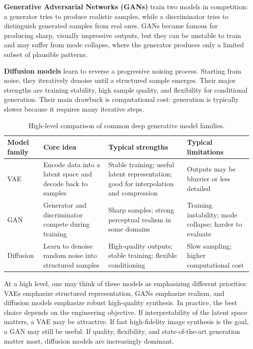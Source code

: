\documentclass[12pt]{article}
\begin{document}
\textbf{Generative Adversarial Networks (GANs)} train two models in competition: a generator tries to produce realistic samples, while a discriminator tries to distinguish generated samples from real ones. GANs became famous for producing sharp, visually impressive outputs, but they can be unstable to train and may suffer from mode collapse, where the generator produces only a limited subset of plausible patterns.

\textbf{Diffusion models} learn to reverse a progressive noising process. Starting from noise, they iteratively denoise until a structured sample emerges. Their major strengths are training stability, high sample quality, and flexibility for conditional generation. Their main drawback is computational cost: generation is typically slower because it requires many iterative steps.

\begin{table}[ht]
\centering
\caption{High-level comparison of common deep generative model families.}
\begin{tabular}{p{} p{} p{} p{}}
\toprule
\textbf{Model family} & \textbf{Core idea} & \textbf{Typical strengths} & \textbf{Typical limitations} \\
\midrule
VAE & Encode data into a latent space and decode back to samples & Stable training; useful latent representation; good for interpolation and compression & Outputs may be blurrier or less detailed \\
GAN & Generator and discriminator compete during training & Sharp samples; strong perceptual realism in some domains & Training instability; mode collapse; harder to evaluate \\
Diffusion & Learn to denoise random noise into structured samples & High-quality outputs; stable training; flexible conditioning & Slow sampling; higher computational cost \\
\bottomrule
\end{tabular}
\end{table}

At a high level, one may think of these models as emphasizing different priorities: VAEs emphasize structured representation, GANs emphasize realism, and diffusion models emphasize robust high-quality synthesis. In practice, the best choice depends on the engineering objective. If interpretability of the latent space matters, a VAE may be attractive. If fast high-fidelity image synthesis is the goal, a GAN may still be useful. If quality, flexibility, and state-of-the-art generation matter most, diffusion models are increasingly dominant.
\end{document}
